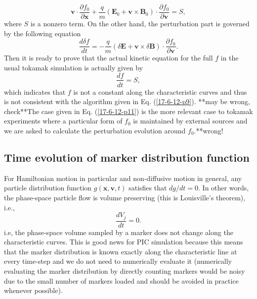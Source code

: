 \documentclass{article}
\begin{document}
\begin{equation}
  \label{17-6-12-p4} \mathbf{v} \cdot \frac{\partial f_0}{\partial \mathbf{x}}
  + \frac{q}{m} (\mathbf{E}_0 +\mathbf{v} \times \mathbf{B}_0) \cdot
  \frac{\partial f_0}{\partial \mathbf{v}} = S,
\end{equation}
where $S$ is a nonzero term. On the other hand, the perturbation part is
governed by the following equation
\begin{equation}
  \frac{d \delta f}{d t} = - \frac{q}{m} (\delta \mathbf{E}+\mathbf{v} \times
  \delta \mathbf{B}) \cdot \frac{\partial f_0}{\partial \mathbf{v}} .
\end{equation}
Then it is ready to prove that the actual kinetic equation for the full $f$ in
the usual tokamak simulation is actually given by
\begin{equation}
  \label{17-6-12-p11} \frac{d f}{d t} = S,
\end{equation}
which indicates that $f$ is not a constant along the characteristic curves and
thus is not consistent with the algorithm given in Eq. (\ref{17-6-12-p9}).
**may be wrong, check**The case given in Eq. (\ref{17-6-12-p11}) is the more
relevant case to tokamak experiments where a particular form of $f_0$ is
maintained by external sources and we are asked to calculate the perturbation
evolution around $f_0$.**wrong!

\subsection{Time evolution of marker distribution function}\label{16-5-26-2}

For Hamiltonian motion in particular and non-diffusive motion in general, any
particle distribution function $g (\mathbf{x}, \mathbf{v}, t)$ satisfies that
$d g / d t = 0$. In other words, the phase-space particle flow is volume
preserving (this is Louisville's theorem), i.e.,
\begin{equation}
  \label{16-5-26-3} \frac{d V_j}{d t} = 0.
\end{equation}
i.e, the phase-space volume sampled by a marker does not change along the
characteristic curves. This is good news for PIC simulation because this means
that the marker distribution is known exactly along the characteristic line at
every time-step and we do not need to numerically evaluate it (numerically
evaluating the marker distribution by directly counting markers would be noisy
due to the small number of markers loaded and should be avoided in practice
whenever possible).
\end{document}
